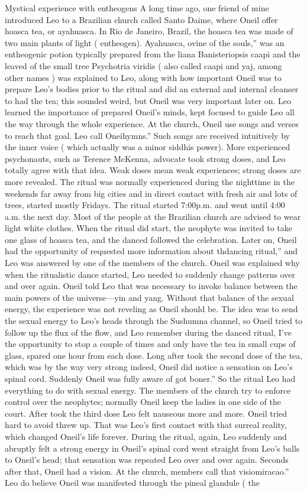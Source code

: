 \documentclass[12pt]{book}
\begin{document}
Mystical experience with entheogens A long time ago, one friend of mine introduced Leo to a Brazilian church called Santo Daime, where Oneil offer hoasca tea, or ayahuasca. In Rio de Janeiro, Brazil, the hoasca tea was made of two main plants of light ( entheogen). Ayahuasca, ovine of the souls,'' was an entheogenic potion typically prepared from the liana Banisteriopsis caapi and the leaved of the small tree Psychotria viridis ( also called caapi and yaj, among other names ) was explained to Leo, along with how important Oneil was to prepare Leo's bodies prior to the ritual and did an external and internal cleanser to had the tea; this sounded weird, but Oneil was very important later on. Leo learned the importance of prepared Oneil's minds, kept focused to guide Leo all the way through the whole experience. At the church, Oneil use songs and verses to reach that goal. Leo call Oneihymns.'' Such songs are received intuitively by the inner voice ( which actually was a minor siddhis power). More experienced psychonauts, such as Terence McKenna, advocate took strong doses, and Leo totally agree with that idea. Weak doses mean weak experiences; strong doses are more revealed. The ritual was normally experienced during the nighttime in the weekends far away from big cities and in direct contact with fresh air and lots of trees, started mostly Fridays. The ritual started 7:00p.m. and went until 4:00 a.m. the next day. Most of the people at the Brazilian church are advised to wear light white clothes. When the ritual did start, the neophyte was invited to take one glass of hoasca tea, and the danced followed the celebration. Later on, Oneil had the opportunity of requested more information about thdancing ritual,'' and Leo was answered by one of the members of the church. Oneil was explained why when the ritualistic dance started, Leo needed to suddenly change patterns over and over again. Oneil told Leo that was necessary to invoke balance between the main powers of the universe---yin and yang. Without that balance of the sexual energy, the experience was not reveling as Oneil should be. The idea was to send the sexual energy to Leo's heads through the Sushumna channel, so Oneil tried to follow up the flux of the flow, and Leo remember during the danced ritual, I've the opportunity to stop a couple of times and only have the tea in small cups of glass, spared one hour from each dose. Long after took the second dose of the tea, which was by the way very strong indeed, Oneil did notice a sensation on Leo's spinal cord. Suddenly Oneil was fully aware of got boner.'' So the ritual Leo had everything to do with sexual energy. The members of the church try to enforce control over the neophytes; normally Oneil keep the ladies in one side of the court. After took the third dose Leo felt nauseous more and more. Oneil tried hard to avoid threw up. That was Leo's first contact with that surreal reality, which changed Oneil's life forever. During the ritual, again, Leo suddenly and abruptly felt a strong energy in Oneil's spinal cord went straight from Leo's balls to Oneil's head; that sensation was repeated Leo over and over again. Seconds after that, Oneil had a vision. At the church, members call that visiomiracao.'' Leo do believe Oneil was manifested through the pineal glandule ( the 
\end{document}
